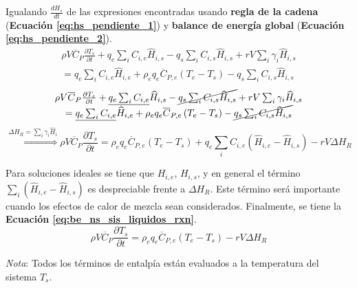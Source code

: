        Igualando \(\frac{d{H}_{s}}{dt}\) de las expresiones encontradas usando \textbf{regla de la cadena} (\textbf{Ecuación \ref{eq:hs_pendiente_1}}) y \textbf{balance de energía global} (\textbf{Ecuación \ref{eq:hs_pendiente_2}}).
        \[
        \begin{matrix}
            \rho V \overline{C}_{P}\frac{\partial T_{s}}{\partial t} + q_{e} \sum_{i} C_{i,e} \widehat{H}_{i,s} - q_{s} \sum_{i} C_{i,s} \widehat{H}_{i,s} + rV \sum_{i} \gamma_{i} \widehat{H}_{i,s} \\
            = q_{e} \sum_{i} C_{i,e} \widehat{H}_{i, e} + \rho_{e} q_{e} \overline{C}_{P,e} \left ( T_{e} - T_{s} \right ) - q_{s} \sum_{i} C_{i,s} \widehat{H}_{i,s}
        \end{matrix}
        \]
        \[\begin{matrix}
            \rho V \overline{C}_{P}\frac{\partial T_{s}}{\partial t} + \underline{q_{e} \sum_{i} C_{i,e}} \widehat{H}_{i,s} - \cancel{q_{s} \sum_{i} C_{i,s} \widehat{H}_{i,s}} + rV \sum_{i} \gamma_{i} \widehat{H}_{i,s} \\
            = \underline{q_{e} \sum_{i} C_{i,e} }\widehat{H}_{i, e} + \rho_{e} q_{e} \overline{C}_{P,e} \left ( T_{e} - T_{s} \right ) - \cancel{q_{s} \sum_{i} C_{i,s} \widehat{H}_{i,s}}
        \end{matrix}\]
        \[\overset{\Delta H_{R} = \sum_{i} \gamma_{i} \widehat{H}_{i}}{\Rightarrow} \rho V \overline{C}_{P}\frac{\partial T_{s}}{\partial t} = \rho_{e} q_{e} \overline{C}_{P,e} \left ( T_{e} - T_{s} \right ) + q_{e} \sum_{i} C_{i,e} \left ( \widehat{H}_{i,e} - \widehat{H}_{i,s} \right ) - rV \Delta H_{R}\]
        
        Para soluciones ideales se tiene que \(H_{i,e}\), \(H_{i,s}\), y en general el término \(\sum_{i} \left ( \widehat{H}_{i,e} - \widehat{H}_{i,s} \right )\) es despreciable frente a \(\Delta H_{R}\). Este término será importante cuando los efectos de calor de mezcla sean considerados. Finalmente, se tiene la \textbf{Ecuación \ref{eq:be_ns_sis_liquidos_rxn}}.
        \begin{equation}
        \label{eq:be_ns_sis_liquidos_rxn}
            \rho V \overline{C}_{P}\frac{\partial T_{s}}{\partial t} = \rho_{e} q_{e} \overline{C}_{P,e} \left ( T_{e} - T_{s} \right ) - rV \Delta H_{R}
        \end{equation}
        
        \textit{Nota}: Todos los términos de entalpía están evaluados a la temperatura del sistema \(T_{s}\).
    
